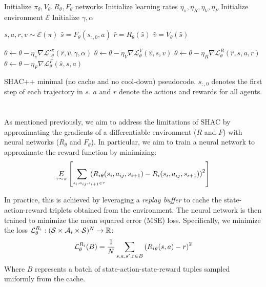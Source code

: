 \begin{algorithm}[t]
    \begin{algorithmic}[1]
    \STATE Initialize $\pi_\theta,V_\theta,R_\theta,F_\theta$ networks
    \STATE Initialize learning rates $\eta_\pi, \eta_R, \eta_V, \eta_F$
    \STATE Initialize environment $\mathcal{E}$
    \STATE Initialize $\gamma, \alpha$
    
        
        \STATE $s,a,r,v \sim \mathcal{E}(\pi)$
        \STATE $\hat{s} = F_\theta(s_{:,0}, a)$
        \STATE $\hat{r} = R_\theta(\hat{s})$
        \STATE $\hat{v} = V_\theta(\hat{s})$
        
        \STATE $\theta \gets \theta - \eta_\pi \nabla \mathcal{L'}^\pi_\theta(\hat{r},\hat{v},\gamma,\alpha)$
        \STATE $\theta \gets \theta - \eta_V \nabla \mathcal{L}^V_\theta(\hat{v},s,v)$
        \STATE $\theta \gets \theta - \eta_R \nabla \mathcal{L}^R_\theta(\hat{r},s,a,r)$
        \STATE $\theta \gets \theta - \eta_F \nabla \mathcal{L}^F_\theta(\hat{s},s,a)$
    
    \ENDFOR
    
    \end{algorithmic}
    \caption{SHAC++ minimal (no cache and no cool-down) pseudocode. $s_{:,0}$ denotes the first step of each trajectory in $s$. $a$ and $r$ denote the actions and rewards for all agents.}
    \label{alg:shacpp}
\end{algorithm}


\section{\fname{}}

As mentioned previously, we aim to address the limitations of SHAC by approximating the gradients of a differentiable environment ($R$ and $F$) with neural networks ($R_\theta$ and $F_\theta$). In particular, we aim to train a neural network to approximate the reward function by minimizing: 
\begin{align*}
    \underset{\tau\sim\pi}{E}\left[\hspace{-.7cm}\sum_{\hspace{.7cm}\scriptscriptstyle s_i,a_{ij},s_{i+1}\in\tau} \hspace{-.8cm}\left( {\rewards{i}}_\theta(s_i, a_{ij}, s_{i+1}) -\rewards{i}(s_i, a_{ij}, s_{i+1}) \right)^2\right] 
\end{align*}

In practice, this is achieved by leveraging a \emph{replay buffer} to cache the state-action-reward triplets obtained from the environment. The neural network is then trained to minimize the mean squared error (MSE) loss. Specifically, we minimize the loss $\mathcal{L}_\theta^{R_{i}}:(\mathcal{S}\times\mathcal{A}_{i}\times\mathcal{S})^N\rightarrow\mathbb{R}$:
$$ \mathcal{L}_\theta^{R_{i}}(B) = \frac{1}{N}\sum_{s,a,s',r \in B}\left( {R_{i}}_\theta(s, a) - r \right)^2 $$
Where $B$ represents a batch of state-action-state-reward tuples sampled uniformly from the cache.

